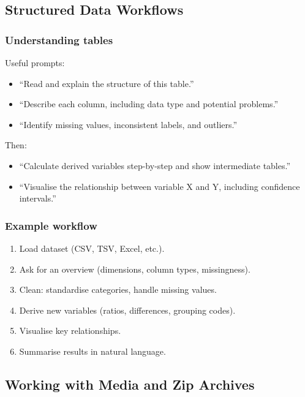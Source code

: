 \documentclass[
  letterpaper,
  DIV=11,
  numbers=noendperiod]{scrreprt}
\providecommand{\tightlist}{%
  \setlength{\itemsep}{0pt}\setlength{\parskip}{0pt}}
\begin{document}
\subsection{Structured Data Workflows}\label{structured-data-workflows}

\subsubsection{Understanding tables}\label{understanding-tables}

Useful prompts:

\begin{itemize}
\tightlist
\item
  ``Read and explain the structure of this table.''
\item
  ``Describe each column, including data type and potential problems.''
\item
  ``Identify missing values, inconsistent labels, and outliers.''
\end{itemize}

Then:

\begin{itemize}
\tightlist
\item
  ``Calculate derived variables step-by-step and show intermediate
  tables.''
\item
  ``Visualise the relationship between variable X and Y, including
  confidence intervals.''
\end{itemize}

\subsubsection{Example workflow}\label{example-workflow}

\begin{enumerate}
\def\labelenumi{\arabic{enumi}.}
\tightlist
\item
  Load dataset (CSV, TSV, Excel, etc.).
\item
  Ask for an overview (dimensions, column types, missingness).
\item
  Clean: standardise categories, handle missing values.
\item
  Derive new variables (ratios, differences, grouping codes).
\item
  Visualise key relationships.
\item
  Summarise results in natural language.
\end{enumerate}

\subsection{Working with Media and Zip
Archives}\label{working-with-media-and-zip-archives}
\end{document}
